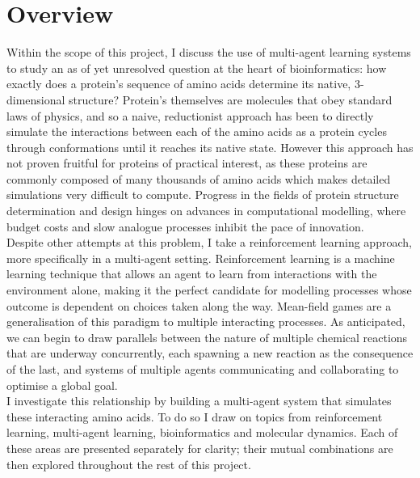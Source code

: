 \section{Overview}
Within the scope of this project, I discuss the use of 
multi-agent learning systems to study an as of yet unresolved question 
at the heart of bioinformatics: how exactly does a protein's sequence
of amino acids determine its native, 3-dimensional structure?
Protein's themselves are molecules that obey standard laws of physics,
and so a naive, reductionist approach has been to directly simulate 
the interactions between each of the amino acids as a protein cycles
through conformations until it reaches its native state. However this 
approach has not proven fruitful for proteins of practical interest, as 
these proteins are commonly composed of many thousands of amino acids which
makes detailed simulations very difficult to compute. Progress in the fields
of protein structure determination and design hinges on advances in 
computational modelling, where budget costs and slow analogue processes 
inhibit the pace of innovation. \\

Despite other attempts at this problem, I take a reinforcement learning approach,
more specifically in a multi-agent setting. Reinforcement learning is a machine
learning technique that allows an agent to learn from interactions with the environment
alone, making it the perfect candidate for modelling processes whose outcome is 
dependent on choices taken along the way. Mean-field games are a generalisation
of this paradigm to multiple interacting processes. As anticipated, we can begin
to draw parallels between the nature of multiple chemical reactions that are underway
concurrently, each spawning a new reaction as the consequence of the last, and systems
of multiple agents communicating and collaborating to optimise a global goal.\\

I investigate this relationship by building a multi-agent system that simulates
these interacting amino acids. To do so I draw on topics from reinforcement learning,
multi-agent learning, bioinformatics and molecular dynamics. Each of these areas 
are presented separately for clarity; their mutual combinations are then explored 
throughout the rest of this project.
